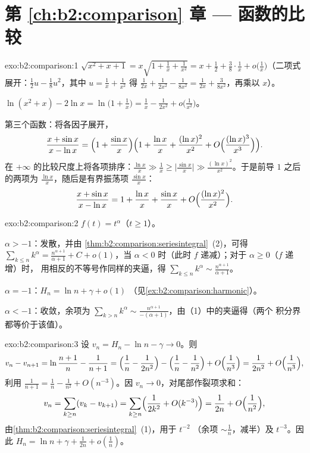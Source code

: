 \section*{第 \ref{ch:b2:comparison} 章 --- 函数的比较}

\begin{solution}{exo:b2:comparison:1}
$\sqrt{x^2 + x + 1} = x\sqrt{1 + \tfrac1x + \tfrac{1}{x^2}} = x +
\frac12 + \frac38\cdot\frac1x + o\bigl(\frac1x\bigr)$（二项式
展开：$\frac12 u - \frac18 u^2$，其中 $u = \frac1x +
\frac{1}{x^2}$ 得 $\frac{1}{2x} + \frac{1}{2x^2} -
\frac{1}{8x^2} = \frac{1}{2x} + \frac{3}{8x^2}$，再乘以
$x$）。

$\ln(x^2 + x) - 2\ln x = \ln\bigl(1 + \tfrac1x\bigr) = \frac1x -
\frac{1}{2x^2} + o\bigl(\frac{1}{x^2}\bigr)$。

第三个函数：将各因子展开，
\[
\frac{x + \sin x}{x - \ln x}
= \Bigl(1 + \frac{\sin x}{x}\Bigr)
\Bigl(1 + \frac{\ln x}{x} + \frac{(\ln x)^2}{x^2} +
O\Bigl(\frac{(\ln x)^3}{x^3}\Bigr)\Bigr).
\]
在 $+\infty$ 的比较尺度上将各项排序：$\frac{\ln x}{x}
\gg \frac{1}{x} \geq \bigl|\frac{\sin x}{x}\bigr| \gg \frac{(\ln
x)^2}{x^2}$。于是前导 $1$ 之后的两项为
$\frac{\ln x}{x}$，随后是有界振荡项 $\frac{\sin
x}{x}$：
\[
\frac{x + \sin x}{x - \ln x}
= 1 + \frac{\ln x}{x} + \frac{\sin x}{x}
+ O\Bigl(\frac{(\ln x)^2}{x^2}\Bigr).
\]
\end{solution}

\begin{solution}{exo:b2:comparison:2}
$f(t) = t^\alpha$（$t \geq 1$）。

$\alpha > -1$：发散，并由
\cref{thm:b2:comparison:seriesintegral}~(2)，可得 $\sum_{k\leq n}
k^\alpha = \frac{n^{\alpha+1}}{\alpha+1} + C + o(1)$，当 $\alpha <
0$ 时（此时 $f$ 递减）；对于 $\alpha \geq 0$（$f$ 递增）时，
用相反的不等号作同样的夹逼，得 $\sum_{k \leq n}
k^\alpha \sim \frac{n^{\alpha + 1}}{\alpha + 1}$。

$\alpha = -1$：$H_n = \ln n + \gamma + o(1)$
（见\cref{ex:b2:comparison:harmonic}）。

$\alpha < -1$：收敛，余项为 $\sum_{k > n} k^\alpha
\sim \frac{n^{\alpha+1}}{-(\alpha+1)}$，由（1）中的夹逼得（两个
积分界都等价于该值）。
\end{solution}

\begin{solution}{exo:b2:comparison:3}
设 $v_n = H_n - \ln n - \gamma \to 0$。则
\[
v_n - v_{n+1} = \ln\frac{n+1}{n} - \frac{1}{n+1}
= \Bigl(\frac1n - \frac{1}{2n^2}\Bigr) - \Bigl(\frac1n -
\frac{1}{n^2}\Bigr) + O\Bigl(\frac{1}{n^3}\Bigr)
= \frac{1}{2n^2} + O\Bigl(\frac{1}{n^3}\Bigr),
\]
利用 $\frac{1}{n+1} = \frac1n - \frac{1}{n^2} + O(n^{-3})$。因
$v_n \to 0$，对尾部作裂项求和：
\[
v_n = \sum_{k \geq n} (v_k - v_{k+1})
= \sum_{k\geq n} \Bigl(\frac{1}{2k^2} + O(k^{-3})\Bigr)
= \frac{1}{2n} + O\Bigl(\frac{1}{n^2}\Bigr),
\]
由\cref{thm:b2:comparison:seriesintegral}~(1)，用于 $t^{-2}$
（余项 $\sim \frac1n$，减半）及 $t^{-3}$。因此 $H_n =
\ln n + \gamma + \frac{1}{2n} + o(\frac1n)$。
\end{solution}

